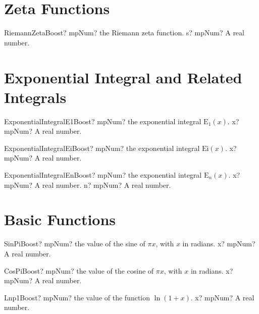 \documentclass[12pt,a4paper,openany]{book}
\begin{document}
\section{Zeta Functions}

\begin{mpFunctionsExtract}
\mpFunctionOne
{RiemannZetaBoost? mpNum? the Riemann zeta function.}
{s? mpNum? A real number.}
\end{mpFunctionsExtract}

\section{Exponential Integral and Related Integrals}

\begin{mpFunctionsExtract}
\mpFunctionOne
{ExponentialIntegralE1Boost? mpNum? the exponential integral $\text{E}_1(x)$.}
{x? mpNum? A real number.}
\end{mpFunctionsExtract}

\begin{mpFunctionsExtract}
\mpFunctionOne
{ExponentialIntegralEiBoost? mpNum? the exponential integral $\text{Ei}(x)$.}
{x? mpNum? A real number.}
\end{mpFunctionsExtract}

\begin{mpFunctionsExtract}
\mpFunctionTwo
{ExponentialIntegralEnBoost? mpNum? the exponential integral  $\text{E}_n(x)$.}
{x? mpNum? A real number.}
{n? mpNum? A real number.}
\end{mpFunctionsExtract}

\section{Basic Functions}

\begin{mpFunctionsExtract}
\mpFunctionOne
{SinPiBoost? mpNum? the value of the sine of $\pi x$, with $x$ in radians.}
{x? mpNum? A real number.}
\end{mpFunctionsExtract}

\begin{mpFunctionsExtract}
\mpFunctionOne
{CosPiBoost? mpNum? the value of the cosine of $\pi x$, with $x$ in radians.}
{x? mpNum? A real number.}
\end{mpFunctionsExtract}

\begin{mpFunctionsExtract}
\mpFunctionOne
{Lnp1Boost? mpNum? the value of the function $\ln(1+x)$.}
{x? mpNum? A real number.}
\end{mpFunctionsExtract}
\end{document}
